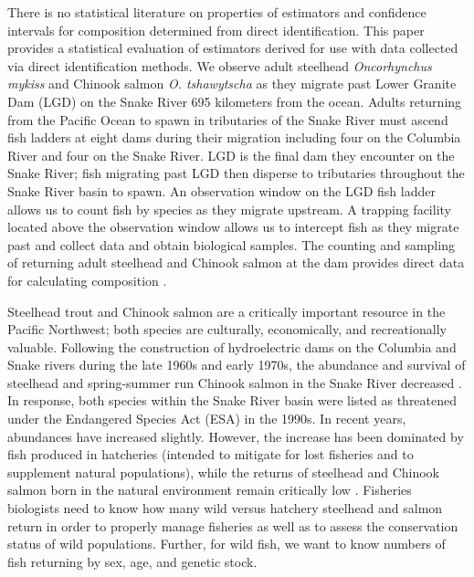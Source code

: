 \documentclass[12pt]{article}
\begin{document}
There is no statistical literature on properties of estimators and confidence intervals for composition determined from direct identification. This paper provides a statistical evaluation of estimators derived for use with data collected via direct identification methods. We observe adult steelhead \textit{Oncorhynchus mykiss} and Chinook salmon \textit{O. tshawytscha} as they migrate past Lower Granite Dam (LGD) on the Snake River 695 kilometers from the ocean. Adults returning from the Pacific Ocean to spawn in tributaries of the Snake River must ascend fish ladders at eight dams during their migration including four on the Columbia River and four on the Snake River. LGD is the final dam they encounter on the Snake River; fish migrating past LGD then disperse to tributaries throughout the Snake River basin to spawn. An observation window on the LGD fish ladder allows us to count fish by species as they migrate upstream.  A trapping facility located above the observation window allows us to intercept fish as they migrate past and collect data and obtain biological samples.  The counting and sampling of returning adult steelhead and Chinook salmon at the dam provides direct data for calculating composition \cite{Harmon2003,Steinhorst2010,Schrader2013}.

Steelhead trout and Chinook salmon are a critically important resource in the Pacific Northwest; both species are culturally, economically, and recreationally valuable. Following the construction of hydroelectric dams on the Columbia and Snake rivers during the late 1960s and early 1970s, the abundance and survival of steelhead and spring-summer run Chinook salmon in the Snake River decreased \cite{Raymond88}. In response, both species within the Snake River basin were listed as threatened under the Endangered Species Act (ESA) in the 1990s. In recent years, abundances have increased slightly. However, the increase has been dominated by fish produced in hatcheries (intended to mitigate for lost fisheries and to supplement natural populations), while the returns of steelhead and Chinook salmon born in the natural environment remain critically low \cite{Busby1996}. Fisheries biologists need to know how many wild versus hatchery steelhead and salmon return in order to properly manage fisheries as well as to assess the conservation status of wild populations. Further, for wild fish, we want to know numbers of fish returning by sex, age, and genetic stock.
\end{document}
